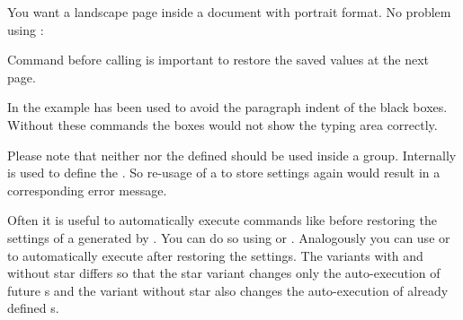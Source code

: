 \begin{Example}
  You want a landscape page inside a document with portrait format. No problem
  using :
  Command  before calling
   is important to restore the saved values at the next
  page.
\end{Example}
In the example  has been used to avoid the paragraph indent of
the black boxes. Without these commands the boxes would not show the 
typing area correctly.

Please note that neither  nor the
defined  should be used inside a group. Internally
 is
used to define the . So re-usage of a
 to store settings again would result in a
corresponding error message.

Often it is useful to automatically
execute commands like  before
restoring the settings of a  generated by
. You can do so using  or
. Analogously you can use 
or  to automatically execute  after
restoring the settings. The variants with and without star differs so that the
star variant changes only the auto-execution  of future
s and the variant without star also changes the auto-execution
 of already defined s.
%
\EndIndexGroup


